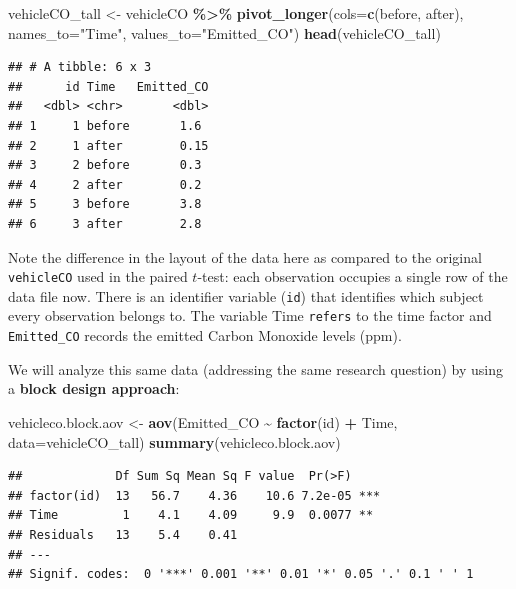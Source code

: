 \documentclass[
]{book}
\newenvironment{Shaded}{\begin{snugshade}}{\end{snugshade}}
\newcommand{\AttributeTok}[1]{\textcolor[rgb]{0.13,0.29,0.53}{#1}}
\newcommand{\FunctionTok}[1]{\textcolor[rgb]{0.13,0.29,0.53}{\textbf{#1}}}
\newcommand{\NormalTok}[1]{#1}
\newcommand{\OtherTok}[1]{\textcolor[rgb]{0.56,0.35,0.01}{#1}}
\newcommand{\SpecialCharTok}[1]{\textcolor[rgb]{0.81,0.36,0.00}{\textbf{#1}}}
\newcommand{\StringTok}[1]{\textcolor[rgb]{0.31,0.60,0.02}{#1}}
\begin{document}
\begin{Shaded}
\begin{Highlighting}[]
\NormalTok{vehicleCO\_tall }\OtherTok{\textless{}{-}}\NormalTok{ vehicleCO }\SpecialCharTok{\%\textgreater{}\%}
  \FunctionTok{pivot\_longer}\NormalTok{(}\AttributeTok{cols=}\FunctionTok{c}\NormalTok{(before, after),}
               \AttributeTok{names\_to=}\StringTok{"Time"}\NormalTok{,}
               \AttributeTok{values\_to=}\StringTok{"Emitted\_CO"}\NormalTok{)}
\FunctionTok{head}\NormalTok{(vehicleCO\_tall)}
\end{Highlighting}
\end{Shaded}

\begin{verbatim}
## # A tibble: 6 x 3
##      id Time   Emitted_CO
##   <dbl> <chr>       <dbl>
## 1     1 before       1.6 
## 2     1 after        0.15
## 3     2 before       0.3 
## 4     2 after        0.2 
## 5     3 before       3.8 
## 6     3 after        2.8
\end{verbatim}

Note the difference in the layout of the data here as compared to the original \texttt{vehicleCO} used in the paired \(t\)-test: each observation occupies a single row of the data file now.
There is an identifier variable (\texttt{id}) that identifies which subject every observation belongs to.
The variable Time \texttt{refers} to the time factor and \texttt{Emitted\_CO} records the emitted Carbon Monoxide levels (ppm).

We will analyze this same data (addressing the same research question) by using a \textbf{block design approach}:

\begin{Shaded}
\begin{Highlighting}[]
\NormalTok{vehicleco.block.aov }\OtherTok{\textless{}{-}} \FunctionTok{aov}\NormalTok{(Emitted\_CO }\SpecialCharTok{\textasciitilde{}} \FunctionTok{factor}\NormalTok{(id) }\SpecialCharTok{+}\NormalTok{ Time, }\AttributeTok{data=}\NormalTok{vehicleCO\_tall)}
\FunctionTok{summary}\NormalTok{(vehicleco.block.aov)}
\end{Highlighting}
\end{Shaded}

\begin{verbatim}
##             Df Sum Sq Mean Sq F value  Pr(>F)    
## factor(id)  13   56.7    4.36    10.6 7.2e-05 ***
## Time         1    4.1    4.09     9.9  0.0077 ** 
## Residuals   13    5.4    0.41                    
## ---
## Signif. codes:  0 '***' 0.001 '**' 0.01 '*' 0.05 '.' 0.1 ' ' 1
\end{verbatim}
\end{document}
